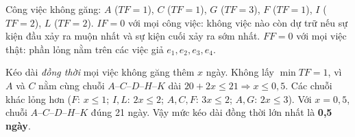 \documentclass[12pt,a4paper]{article}
\begin{document}
Công việc không găng: $A$ ($TF=1$), $C$ ($TF=1$), $G$ ($TF=3$), $F$ ($TF=1$), $I$ ($TF=2$), $L$ ($TF=2$).
$IF=0$ với mọi công việc: không việc nào còn dự trữ nếu sự kiện đầu xảy ra muộn nhất và sự kiện cuối xảy ra sớm nhất.
$FF=0$ với mọi việc thật: phần lỏng nằm trên các việc giả $e_1,e_2,e_3,e_4$.

Kéo dài \emph{đồng thời} mọi việc không găng thêm $x$ ngày.
Không lấy $\min TF=1$, vì $A$ và $C$ nằm cùng chuỗi
$A$--$C$--$D$--$H$--$K$ dài $20+2x\le 21\Rightarrow x\le 0{,}5$.
Các chuỗi khác lỏng hơn ($F$: $x\le 1$; $I,L$: $2x\le 2$; $A,C,F$: $3x\le 2$; $A,G$: $2x\le 3$).
Với $x=0{,}5$, chuỗi $A$--$C$--$D$--$H$--$K$ đúng 21 ngày. Vậy mức kéo dài đồng thời lớn nhất là \textbf{0,5 ngày}.
\end{document}
